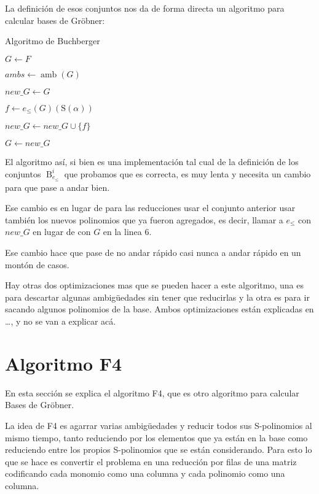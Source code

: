 \documentclass{report}
\theoremstyle{customstyle}
\theoremstyle{factstyle}
\DeclareMathOperator{\amb}{amb}
\renewcommand{\S}{\text{S}}
\DeclareMathOperator{\B}{B}
\begin{document}
La definición de esos conjuntos nos da de forma directa un algoritmo para calcular bases de Gröbner:

\begin{algorithm}[H] %
  \caption{Algoritmo de Buchberger}\label{alg:Buchberger}
  $G ← F$

  \Loop{} {
    $ambs ← \amb(G)$

    $new\_G ← G$

     {
      $f ← e_≤(G)(\S(α))$

       {
        $new\_G ← new\_G ∪ \{f\}$
      }
    }

     {
      \Break
    }

    $G ← new\_G$
  }
\end{algorithm}

El algoritmo así, si bien es una implementación tal cual de la definición de los conjuntos $\B_{e_≤}^i$ que probamos que es correcta, es muy lenta y necesita un cambio para que pase a andar bien.

Ese cambio es en lugar de para las reducciones usar el conjunto anterior usar también los nuevos polinomios que ya fueron agregados, es decir, llamar a $e_≤$ con $new\_G$ en lugar de con $G$ en la linea 6. %

Ese cambio hace que pase de no andar rápido casi nunca a andar rápido en un montón de casos.

Hay otras dos optimizaciones mas que se pueden hacer a este algoritmo, una es para descartar algunas ambigüedades sin tener que reducirlas y la otra es para ir sacando algunos polinomios de la base. Ambos optimizaciones están explicadas en …, %
y no se van a explicar acá.

\section{Algoritmo F4}

En esta sección se explica el algoritmo F4, que es otro algoritmo para calcular Bases de Gröbner.

La idea de F4 es agarrar varias ambigüedades y reducir todos sus S-polinomios al mismo tiempo, tanto reduciendo por los elementos que ya están en la base como reduciendo entre los propios S-polinomios que se están considerando. Para esto lo que se hace es convertir el problema en una reducción por filas de una matriz codificando cada monomio como una columna y cada polinomio como una columna.
\end{document}
